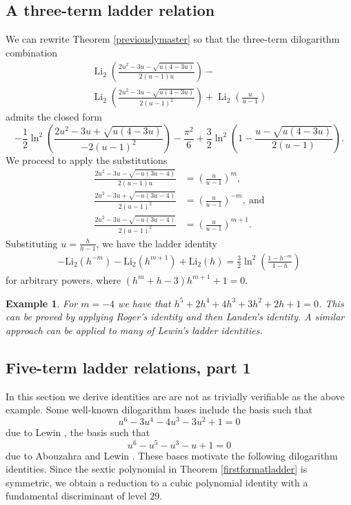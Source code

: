\documentclass[12pt]{article}
\newtheorem{example}{Example}
\begin{document}
\subsection{A three-term ladder relation}\label{subsection3ladder}
 We can rewrite Theorem \ref{previouslymaster} so that the three-term dilogarithm combination 
\begin{multline*} 
 \operatorname{Li}_2\left(\frac{2u^2 - 3u - \sqrt{u(4-3u)}}{2(u - 1)u}\right) - \\ 
 \operatorname{Li}_2\left(\frac{2u^2 - 3u - \sqrt{u(4 - 3u)}}{2(u - 1)^2}\right) 
 + \operatorname{Li}_2\left(\frac{u}{u - 1}\right) 
\end{multline*}
 admits the closed form 
 $$ - \frac{1}{2} \ln^2\left(\frac{2u^2 - 3u + \sqrt{u(4 - 3u)}}{-2(u - 1)^2}\right) - \frac{\pi^2}{6}
 + \frac{3}{2} \ln^2\left(1 - \frac{u - \sqrt{u(4 - 3u)}}{2(u - 1)}\right). $$
 We proceed to apply the substitutions 
\begin{align*}
\frac{2u^2 - 3u - \sqrt{-u(3u - 4)}}{2(u - 1)u} & = \left(\frac{u}{u - 1}\right)^m,\\
\frac{2u^2 - 3u + \sqrt{-u(3u - 4)}}{2(u - 1)^2} & = \left(\frac{u}{u - 1}\right)^{-m}, \ \text{and} \\
\frac{2u^2 - 3u - \sqrt{-u(3u - 4)}}{2(u - 1)^2} & = \left(\frac{u}{u - 1}\right)^{m + 1}. 
\end{align*}
 Substituting $u = \frac{h}{h-1}$, we have the ladder identity 
\begin{equation*}
\begin{aligned}
- \mathrm{Li}_2(h^{-m}) - \mathrm{Li}_2(h^{m+1}) + \mathrm{Li}_2(h) = \frac{3}{2} \ln^2\left( \frac{1 - h^{-m}}{1 - h} \right)
\end{aligned}
\end{equation*}
 for arbitrary powers, where $(h^m + h - 3) h^{m + 1} + 1 = 0$. 

\begin{example}
 For $m=-4$ we have that $h^5 + 2 h^4 + 4 h^3 + 3 h^2 + 2 h + 1=0$. 
 This can be proved by applying Roger's identity and then Landen's identity. 
 A similar approach can be applied to many of Lewin's ladder identities. 
\end{example}

\subsection{Five-term ladder relations, part 1}\label{section5term1}
 In this section we derive identities are are not as trivially verifiable as the above example. Some well-known dilogarithm bases include 
 the basis such that $$u^6-3u^4-4u^3-3u^2+1=0$$ due to Lewin \cite{Lewin1991text}, the basis such that $$u^6-u^5 - 
 u^3-u+1=0$$ due to Abouzahra and Lewin \cite{AbouzahraLewin1985}. These bases motivate the following dilogarithm identities. 
 Since the sextic polynomial in Theorem \ref{firstformatladder} is symmetric, we obtain a reduction to a cubic polynomial identity 
 with a fundamental discriminant of level $29$. 
\end{document}
